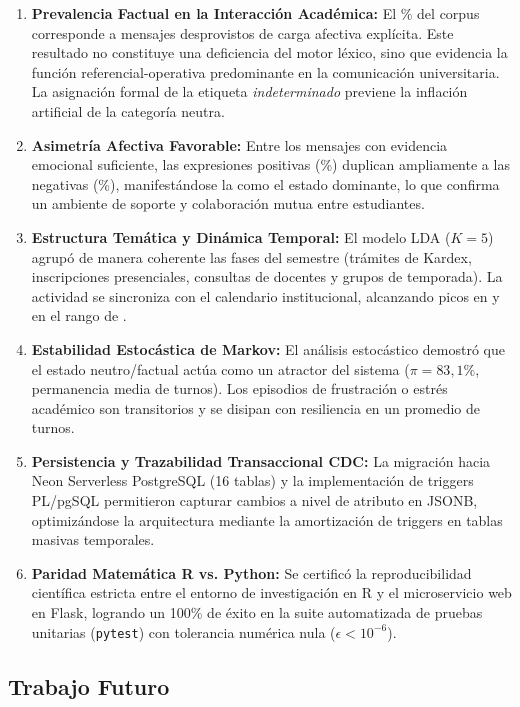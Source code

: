 \begin{enumerate}[leftmargin=1.6em]
  \item \textbf{Prevalencia Factual en la Interacción Académica:} El \pctIndeterminado{}\% del corpus corresponde a mensajes desprovistos de carga afectiva explícita. Este resultado no constituye una deficiencia del motor léxico, sino que evidencia la función referencial-operativa predominante en la comunicación universitaria. La asignación formal de la etiqueta \emph{indeterminado} previene la inflación artificial de la categoría neutra.
  \item \textbf{Asimetría Afectiva Favorable:} Entre los mensajes con evidencia emocional suficiente, las expresiones positivas (\pctPositivos{}\%) duplican ampliamente a las negativas (\pctNegativos{}\%), manifestándose la \emph{\emocionTop{}} como el estado dominante, lo que confirma un ambiente de soporte y colaboración mutua entre estudiantes.
  \item \textbf{Estructura Temática y Dinámica Temporal:} El modelo LDA ($K=5$) agrupó de manera coherente las fases del semestre (trámites de Kardex, inscripciones presenciales, consultas de docentes y grupos de temporada). La actividad se sincroniza con el calendario institucional, alcanzando picos en \diaPico{} y en el rango de \horaPico{}.
  \item \textbf{Estabilidad Estocástica de Markov:} El análisis estocástico demostró que el estado neutro/factual actúa como un atractor del sistema ($\pi = 83,1\%$, permanencia media de \permanenciaNeutro{} turnos). Los episodios de frustración o estrés académico son transitorios y se disipan con resiliencia en un promedio de \recuperacionNegativa{} turnos.
  \item \textbf{Persistencia y Trazabilidad Transaccional CDC:} La migración hacia Neon Serverless PostgreSQL (16 tablas) y la implementación de triggers PL/pgSQL permitieron capturar cambios a nivel de atributo en JSONB, optimizándose la arquitectura mediante la amortización de triggers en tablas masivas temporales.
  \item \textbf{Paridad Matemática R vs. Python:} Se certificó la reproducibilidad científica estricta entre el entorno de investigación en R y el microservicio web en Flask, logrando un 100\% de éxito en la suite automatizada de pruebas unitarias (\texttt{pytest}) con tolerancia numérica nula ($\epsilon < 10^{-6}$).
\end{enumerate}

\subsection{Trabajo Futuro}

